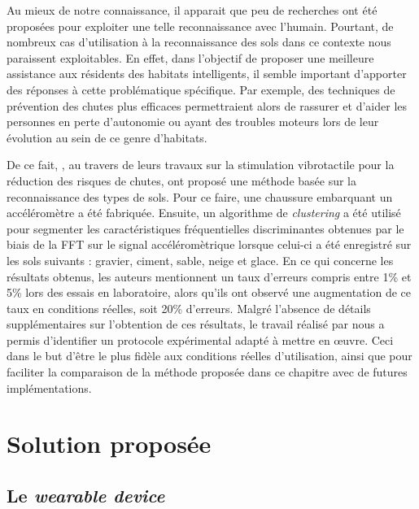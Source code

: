 Au mieux de notre connaissance, il apparait que peu de recherches ont été proposées pour exploiter une telle reconnaissance avec l'humain. Pourtant, de nombreux cas d'utilisation à la reconnaissance des sols dans ce contexte nous paraissent exploitables. En effet, dans l'objectif de proposer une meilleure assistance aux résidents des habitats intelligents, il semble important d'apporter des réponses à cette problématique spécifique. Par exemple, des techniques de prévention des chutes plus efficaces permettraient alors de rassurer et d'aider les personnes en perte d'autonomie ou ayant des troubles moteurs lors de leur évolution au sein de ce genre d'habitats.

De ce fait, \cite{Otis2016}, au travers de leurs travaux sur la stimulation vibrotactile pour la réduction des risques de chutes, ont proposé une méthode basée sur la reconnaissance des types de sols. Pour ce faire, une chaussure embarquant un accéléromètre a été fabriquée. Ensuite, un algorithme de \textit{clustering} a été utilisé pour segmenter les caractéristiques fréquentielles discriminantes obtenues par le biais de la \acs{FFT} sur le signal accéléromètrique lorsque celui-ci a été enregistré sur les sols suivants : gravier, ciment, sable, neige et glace. En ce qui concerne les résultats obtenus, les auteurs mentionnent un taux d'erreurs compris entre 1\% et 5\% lors des essais en laboratoire, alors qu'ils ont observé une augmentation de ce taux en conditions réelles, soit 20\% d'erreurs. Malgré l'absence de détails supplémentaires sur l'obtention de ces résultats, le travail réalisé par \cite{Otis2016} nous a permis d'identifier un protocole expérimental adapté à mettre en \oe{}uvre. Ceci dans le but d'être le plus fidèle aux conditions réelles d'utilisation, ainsi que pour faciliter la comparaison de la méthode proposée dans ce chapitre avec de futures implémentations.

\section{Solution proposée}

\subsection{Le \textit{wearable device}}

